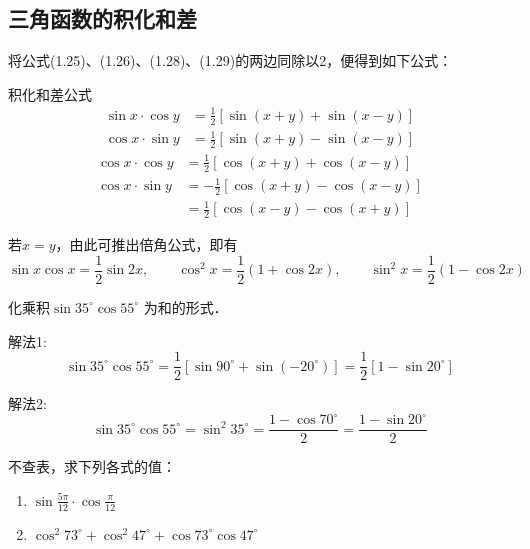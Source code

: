 \subsection{三角函数的积化和差}
将公式(1.25)、(1.26)、(1.28)、(1.29)的两边同除以2，便得到如下公式：

\begin{blk}{积化和差公式}
\begin{align*}
\sin x\cdot\cos y  &= \frac{1}{2} [\sin (x+y) +\sin (x-y)] \tag{V}\\
\cos x\cdot \sin y &=\frac{1}{2}  [\sin (x+y)-\sin (x-y)] \tag{VI} 
\end{align*} 
\begin{align*}
\cos x\cdot\cos y  &= \frac{1}{2} [\cos (x+y) +\cos (x-y)] \tag{VII}\\
\cos x\cdot \sin y &=-\frac{1}{2}  [\cos (x+y)-\cos (x-y)]  \\
&=\frac{1}{2}[\cos (x-y)-\cos (x+y)] \tag{VIII}
\end{align*} 
\end{blk}

若$x=y$，由此可推出倍角公式，即有
\[\sin x\cos x=\frac{1}{2}\sin 2x,\qquad \cos^2 x=\frac{1}{2}(1+\cos 2x),\qquad \sin^2x=\frac{1}{2}(1-\cos2x)\]

\begin{example}
    化乘积$\sin35^{\circ} \cos55^{\circ}$ 为和的形式．
\end{example}

\begin{solution}
解法1: 
\[\sin35^{\circ} \cos55^{\circ} =\frac{1}{2}[\sin90^{\circ} +\sin (-20^{\circ} ) ]
=\frac{1}{2} [1-\sin20^{\circ} ]\]

解法2:
\[\sin35^{\circ} \cos55^{\circ}=\sin^2 35^{\circ} =\frac{1-\cos 70^{\circ}}{2}=\frac{1-\sin 20^{\circ}}{2}\]
\end{solution}


\begin{example}
    不查表，求下列各式的值：
\begin{enumerate}
    \item $\sin\frac{5\pi}{12}\cdot\cos\frac{\pi}{12}$
    \item $\cos^2 73^{\circ} +\cos^2 47^{\circ} +\cos73^{\circ} \cos47^{\circ}$
\end{enumerate}
\end{example}

